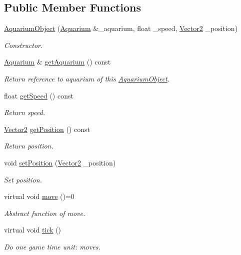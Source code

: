 \subsection*{Public Member Functions}
\begin{DoxyCompactItemize}
\item 
\mbox{\hyperlink{class_aquarium_object_aebe6958a63cab1a4277006d335d3c968}{Aquarium\+Object}} (\mbox{\hyperlink{class_aquarium}{Aquarium}} \&\+\_\+aquarium, float \+\_\+speed, \mbox{\hyperlink{struct_vector2}{Vector2}} \+\_\+position)
\begin{DoxyCompactList}\small\item\em Constructor. \end{DoxyCompactList}\item 
\mbox{\hyperlink{class_aquarium}{Aquarium}} \& \mbox{\hyperlink{class_aquarium_object_a229f2c41d3aa352bcbd7b994dd540f97}{get\+Aquarium}} () const
\begin{DoxyCompactList}\small\item\em Return reference to aquarium of this \mbox{\hyperlink{class_aquarium_object}{Aquarium\+Object}}. \end{DoxyCompactList}\item 
float \mbox{\hyperlink{class_aquarium_object_a0e554167f04a77e452d5714d31fadada}{get\+Speed}} () const
\begin{DoxyCompactList}\small\item\em Return speed. \end{DoxyCompactList}\item 
\mbox{\hyperlink{struct_vector2}{Vector2}} \mbox{\hyperlink{class_aquarium_object_aed4986687e54beb0ce780a9cafbda990}{get\+Position}} () const
\begin{DoxyCompactList}\small\item\em Return position. \end{DoxyCompactList}\item 
void \mbox{\hyperlink{class_aquarium_object_a2ec88f59595aec6ad788b90e9896b9b9}{set\+Position}} (\mbox{\hyperlink{struct_vector2}{Vector2}} \+\_\+position)
\begin{DoxyCompactList}\small\item\em Set position. \end{DoxyCompactList}\item 
virtual void \mbox{\hyperlink{class_aquarium_object_a42c4de640f89ac8aebc26b7618578575}{move}} ()=0
\begin{DoxyCompactList}\small\item\em Abstract function of move. \end{DoxyCompactList}\item 
virtual void \mbox{\hyperlink{class_aquarium_object_a3a8269dfe29631656916cce254e77059}{tick}} ()
\begin{DoxyCompactList}\small\item\em Do one game time unit\+: moves. \end{DoxyCompactList}\end{DoxyCompactItemize}


